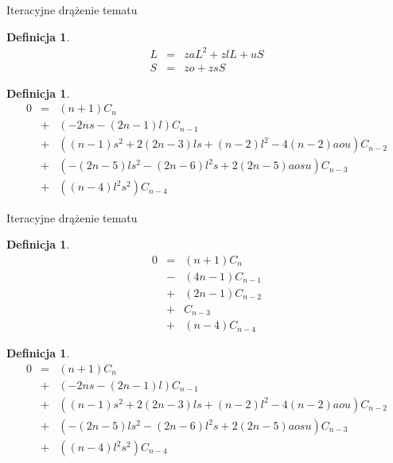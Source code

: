 \documentclass[final]{beamer}
\theoremstyle{bluetheorem}
\theoremstyle{bluetheorem}
\newtheorem{mydefinition}[mytheorem]{Definicja}
\theoremstyle{greentheorem}
\begin{document}
\begin{frame}{Iteracyjne drążenie tematu}
    \begin{mydefinition}
        \[\begin{array}{rcl}
            L &=& zaL^2 + zlL + uS\\
            S &=& zo + zsS
        \end{array}\]
    \end{mydefinition}

    \begin{mydefinition}
        \[\begin{array}{rcl}
                0 &=& (n + 1)C_n\\
                  &+& (-2ns - (2n - 1)l)C_{n - 1}\\
                  &+& ((n-1) s^2 + 2(2n-3)ls + (n-2)l^2 -4(n-2)aou)C_{n - 2}\\
                  &+& (-(2n-5) ls^2 - (2n-6) l^2s + 2(2n-5)aosu)C_{n - 3}\\
                  &+& ((n - 4)l^2s^2)C_{n - 4}
        \end{array}\]
    \end{mydefinition}
\end{frame}

\begin{frame}{Iteracyjne drążenie tematu}
    \begin{mydefinition}
        \[\begin{array}{rcl}
                0 &=& (n + 1)C_n\\
                  &-& (4n - 1)C_{n-1}\\
                  &+& (2n - 1)C_{n-2}\\
                  &+& C_{n-3}\\
                  &+& (n - 4)C_{n-4}
        \end{array}\]
    \end{mydefinition}

    \begin{mydefinition}
        \[\begin{array}{rcl}
                0 &=& (n + 1)C_n\\
                  &+& (-2ns - (2n - 1)l)C_{n - 1}\\
                  &+& ((n-1) s^2 + 2(2n-3)ls + (n-2)l^2 -4(n-2)aou)C_{n - 2}\\
                  &+& (-(2n-5) ls^2 - (2n-6) l^2s + 2(2n-5)aosu)C_{n - 3}\\
                  &+& ((n - 4)l^2s^2)C_{n - 4}
        \end{array}\]
    \end{mydefinition}
\end{frame}
\end{document}
